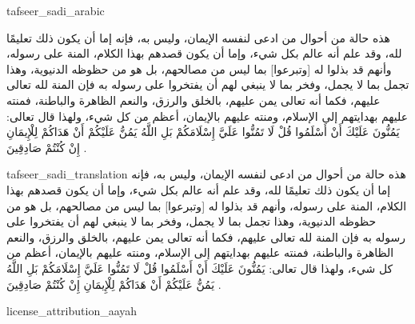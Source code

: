\begin{taggedblock}{tafseer_sadi_arabic}
\begin{Arabic}
هذه حالة من أحوال من ادعى لنفسه الإيمان، وليس به، فإنه إما أن يكون ذلك تعليمًا لله، وقد علم أنه عالم بكل شيء، وإما أن يكون قصدهم بهذا الكلام، المنة على رسوله، وأنهم قد بذلوا له
[وتبرعوا]
بما ليس من مصالحهم، بل هو من حظوظه الدنيوية، وهذا تجمل بما لا يجمل، وفخر بما لا ينبغي لهم أن يفتخروا على رسوله به  فإن المنة لله تعالى عليهم، فكما أنه تعالى يمن  عليهم، بالخلق والرزق، والنعم الظاهرة والباطنة، فمنته عليهم بهدايتهم إلى الإسلام، ومنته عليهم بالإيمان، أعظم  من كل شيء، ولهذا قال تعالى:
{ يَمُنُّونَ عَلَيْكَ أَنْ أَسْلَمُوا قُلْ لَا تَمُنُّوا عَلَيَّ إِسْلَامَكُمْ بَلِ اللَّهُ يَمُنُّ عَلَيْكُمْ أَنْ هَدَاكُمْ لِلْإِيمَانِ إِنْ كُنْتُمْ صَادِقِينَ }
.
\end{Arabic}
\end{taggedblock}
\begin{taggedblock}{tafseer_sadi_translation}
هذه حالة من أحوال من ادعى لنفسه الإيمان، وليس به، فإنه إما أن يكون ذلك تعليمًا لله، وقد علم أنه عالم بكل شيء، وإما أن يكون قصدهم بهذا الكلام، المنة على رسوله، وأنهم قد بذلوا له
[وتبرعوا]
بما ليس من مصالحهم، بل هو من حظوظه الدنيوية، وهذا تجمل بما لا يجمل، وفخر بما لا ينبغي لهم أن يفتخروا على رسوله به  فإن المنة لله تعالى عليهم، فكما أنه تعالى يمن  عليهم، بالخلق والرزق، والنعم الظاهرة والباطنة، فمنته عليهم بهدايتهم إلى الإسلام، ومنته عليهم بالإيمان، أعظم  من كل شيء، ولهذا قال تعالى:
{ يَمُنُّونَ عَلَيْكَ أَنْ أَسْلَمُوا قُلْ لَا تَمُنُّوا عَلَيَّ إِسْلَامَكُمْ بَلِ اللَّهُ يَمُنُّ عَلَيْكُمْ أَنْ هَدَاكُمْ لِلْإِيمَانِ إِنْ كُنْتُمْ صَادِقِينَ }
.
\end{taggedblock}
\begin{taggedblock}{license_attribution_aayah}

\end{taggedblock}
\begin{comment}
Please use the following for footnotes:- Sample\footnoteQ{Text of Qur'an footnote goes here.}.
Sample\footnoteT{Text of Tafseer footnote goes here.}.
\end{comment}